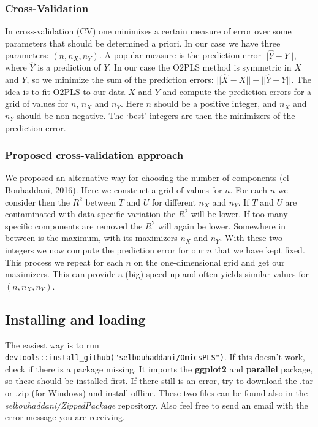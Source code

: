 \documentclass[]{article}
\begin{document}
\hypertarget{cross-validation}{%
\subsubsection{Cross-Validation}\label{cross-validation}}

In cross-validation (CV) one minimizes a certain measure of error over
some parameters that should be determined a priori. In our case we have
three parameters: \((n, n_X, n_Y)\). A popular measure is the prediction
error \(||\hat{Y} - Y||\), where \(\hat{Y}\) is a prediction of \(Y\).
In our case the O2PLS method is symmetric in \(X\) and \(Y\), so we
minimize the sum of the prediction errors:
\(||\hat{X} - X||+||\hat{Y} - Y||\). The idea is to fit O2PLS to our
data \(X\) and \(Y\) and compute the prediction errors for a grid of
values for \(n\), \(n_X\) and \(n_Y\). Here \(n\) should be a positive
integer, and \(n_X\) and \(n_Y\) should be non-negative. The `best'
integers are then the minimizers of the prediction error.

\hypertarget{proposed-cross-validation-approach}{%
\subsubsection{Proposed cross-validation
approach}\label{proposed-cross-validation-approach}}

We proposed an alternative way for choosing the number of components (el
Bouhaddani, 2016). Here we construct a grid of values for \(n\). For
each \(n\) we consider then the \(R^2\) between \(T\) and \(U\) for
different \(n_X\) and \(n_Y\). If \(T\) and \(U\) are contaminated with
data-specific variation the \(R^2\) will be lower. If too many specific
components are removed the \(R^2\) will again be lower. Somewhere in
between is the maximum, with its maximizers \(n_X\) and \(n_Y\). With
these two integers we now compute the prediction error for our \(n\)
that we have kept fixed. This process we repeat for each \(n\) on the
one-dimensional grid and get our maximizers. This can provide a (big)
speed-up and often yields similar values for \((n, n_X, n_Y)\).

\hypertarget{installing-and-loading}{%
\subsection{Installing and loading}\label{installing-and-loading}}

The easiest way is to run
\texttt{devtools::install\_github("selbouhaddani/OmicsPLS")}. If this
doesn't work, check if there is a package missing. It imports the
\textbf{ggplot2} and \textbf{parallel} package, so these should be
installed first. If there still is an error, try to download the .tar or
.zip (for Windows) and install offline. These two files can be found
also in the \emph{selbouhaddani/ZippedPackage} repository. Also feel
free to send an email with the error message you are receiving.
\end{document}
